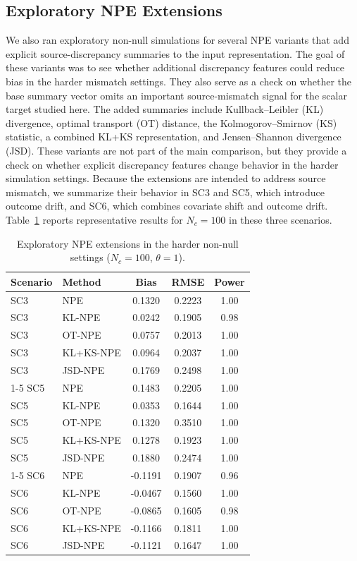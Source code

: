\subsection{Exploratory NPE Extensions}

We also ran exploratory non-null simulations for several NPE variants that add
explicit source-discrepancy summaries to the input representation.
The goal of these variants was to see whether additional discrepancy features
could reduce bias in the harder mismatch settings.
They also serve as a check on whether the base summary vector omits an
important source-mismatch signal for the scalar target studied here.
The added summaries include Kullback--Leibler (KL) divergence, optimal
transport (OT) distance, the Kolmogorov--Smirnov (KS) statistic, a combined
KL+KS representation, and Jensen--Shannon divergence (JSD).
These variants are not part of the main comparison, but they provide a check on
whether explicit discrepancy features change behavior in the harder simulation
settings.
Because the extensions are intended to address source mismatch, we summarize
their behavior in SC3 and SC5, which introduce outcome drift, and SC6, which
combines covariate shift and outcome drift.
Table~\ref{tab:npe-extensions-hard} reports representative results for
$N_c=100$ in these three scenarios.

\begin{table}[H]
\centering
\small
\caption{Exploratory NPE extensions in the harder non-null settings
($N_c=100$, $\theta=1$).}
\label{tab:npe-extensions-hard}
\begin{tabular}{llccc}
\toprule
Scenario & Method & Bias & RMSE & Power \\
\midrule
SC3 & NPE        & 0.1320  & 0.2223 & 1.00 \\
SC3 & KL-NPE     & 0.0242  & 0.1905 & 0.98 \\
SC3 & OT-NPE     & 0.0757  & 0.2013 & 1.00 \\
SC3 & KL+KS-NPE  & 0.0964  & 0.2037 & 1.00 \\
SC3 & JSD-NPE    & 0.1769  & 0.2498 & 1.00 \\
\cmidrule(lr){1-5}
SC5 & NPE        & 0.1483  & 0.2205 & 1.00 \\
SC5 & KL-NPE     & 0.0353  & 0.1644 & 1.00 \\
SC5 & OT-NPE     & 0.1320  & 0.3510 & 1.00 \\
SC5 & KL+KS-NPE  & 0.1278  & 0.1923 & 1.00 \\
SC5 & JSD-NPE    & 0.1880  & 0.2474 & 1.00 \\
\cmidrule(lr){1-5}
SC6 & NPE        & -0.1191 & 0.1907 & 0.96 \\
SC6 & KL-NPE     & -0.0467 & 0.1560 & 1.00 \\
SC6 & OT-NPE     & -0.0865 & 0.1605 & 0.98 \\
SC6 & KL+KS-NPE  & -0.1166 & 0.1811 & 1.00 \\
SC6 & JSD-NPE    & -0.1121 & 0.1647 & 1.00 \\
\bottomrule
\end{tabular}
\end{table}
